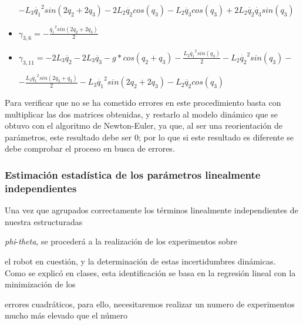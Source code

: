 \begin{itemize}
	$- L_{3}\dot{q_1}^{2}sin(2q_2 + 2q_3) - 2L_2\ddot{q_2}cos(q_3) - L_{2}\ddot{q_3}cos(q_3) + 2L_{2}\dot{q_2}\dot{q_3}sin(q_3) $\\ \vspace{0.2cm}
	
	\item $\gamma_{3,6}=-\frac{\dot{q_1}^{2}sin(2q_2 + 2q_3)}{2} $\\ \vspace{0.2cm}
	
	\item $\gamma_{3,11}=- 2L_{3}\ddot{q_2} - 2L_3\ddot{q_3} - g*cos(q_2 + q_3) - \frac{L_{2}\dot{q_1}^{2}sin(q_3)}{2} - L_2\dot{q_2}^{2}sin(q_3) - $\\ \vspace{0.1cm}
	
	$-\frac{L_2\dot{q_1}^{2}sin(2q_2 + q_3)}{2} - L_{3}\dot{q_1}^{2}sin(2q_2 + 2q_3) - L_2\ddot{q_2}cos(q_3) $\\
	
\end{itemize}



Para verificar que no se ha cometido errores en este procedimiento basta con multiplicar las dos matrices obtenidas, y restarlo al modelo dinámico que se obtuvo con el algoritmo de Newton-Euler, ya que, al ser una reorientación de parámetros, este resultado debe ser 0; por lo que si este resultado es diferente se debe comprobar el proceso en busca de errores.



\newpage

\subsubsection{Estimación estadística de los parámetros linealmente independientes}

Una vez que agrupados correctamente los términos linealmente independientes de nuestra estructuradas

\textit{phi}-\textit{theta}, se procederá a la realización de los experimentos sobre

el robot en cuestión, y la determinación de estas incertidumbres dinámicas.\\



Como se explicó en clases, esta identificación se basa en la regresión lineal con la minimización de los

errores cuadráticos, para ello, necesitaremos realizar un numero de experimentos mucho más elevado que el número

